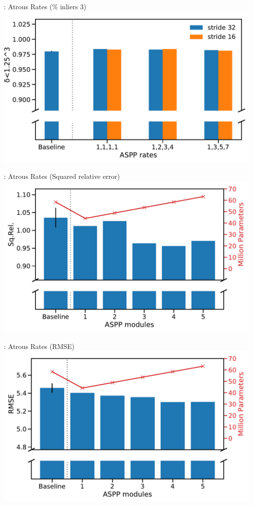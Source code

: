\begin{frame}[c]{\subsecname: Atrous Rates (\% inliers 3)}
  \centering
  \includegraphics[width=1.0\textwidth]{figures/results/experiment1_d<125^3.pdf}
\end{frame}

\begin{frame}[c]{\subsecname: Atrous Rates (Squared relative error)}
  \centering
  \includegraphics[width=1.0\textwidth]{figures/results/experiment2_SqRel.pdf}
\end{frame}

\begin{frame}[c]{\subsecname: Atrous Rates (RMSE)}
  \centering
  \includegraphics[width=1.0\textwidth]{figures/results/experiment2_RMSE.pdf}
\end{frame}

